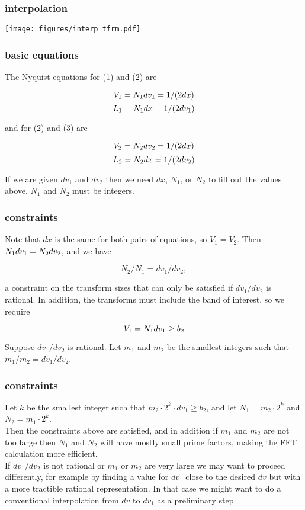 \documentclass[11pt]{beamer}
\begin{document}
\begin{frame}
\frametitle{interpolation}

\begin{center}
  \texttt{[image: figures/interp\_tfrm.pdf]}
\end{center}

\end{frame}
\begin{frame}
\frametitle{basic equations}

The Nyquist equations for (1) and (2) are

\[ V_1 = N_1 \/dv_1 = 1/(2\/ dx) \]
\[ L_1 = N_1 \/dx   = 1/(2\/ dv_1) \]

and for (2) and (3) are

\[ V_2 = N_2 \/dv_2 = 1/ (2\/ dx) \]
\[ L_2 = N_2 \/dx   = 1/ (2\/ dv_2) \]

If we are given $dv_1$ and $dv_2$ then we need $dx$, $N_1$, or $N_2$
to fill out the values above.  $N_1$ and $N_2$ must be integers.

\end{frame}
\begin{frame}
\frametitle{constraints}

Note that $dx$ is the same for both pairs of equations, so $V_1 =
V_2$.  Then $N_1\/dv_1 = N_2\/dv_2$, and we have

\[ N_2 / N_1 = dv_1 / dv_2, \]

a constraint on the transform sizes that can only be satisfied if
$dv_1 / dv_2$ is rational.  In addition, the transforms must include
the band of interest, so we require 

\[ V_1 = N_1\/dv_1 \ge b_2 \]

Suppose $dv_1 / dv_2$ is rational.  Let $m_1$ and $m_2$ be the smallest
integers such that $m_1/m_2 = dv_1 / dv_2$. \\

\end{frame}
\begin{frame}
\frametitle{constraints}

Let $k$ be the smallest integer such that $m_2 \cdot 2^k \cdot dv_1
\ge b_2$, and let $N_1 = m_2 \cdot 2^k$ and $N_2 = m_1 \cdot 2^k$. \\
\bigskip
Then the constraints above are satisfied, and in addition if $m_1$
and $m_2$ are not too large then $N_1$ and $N_2$ will have mostly
small prime factors, making the FFT calculation more efficient. \\
\bigskip
If $dv_1 / dv_2$ is not rational or $m_1$ or $m_2$ are very large we
may want to proceed differently, for example by finding a value for
$dv_1$ close to the desired $dv$ but with a more tractible rational
representation.  In that case we might want to do a conventional
interpolation from $dv$ to $dv_1$ as a preliminary step.

\end{frame}
\end{document}

